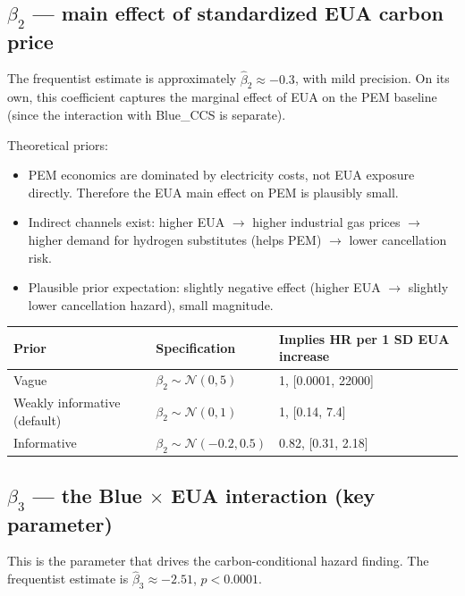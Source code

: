 \documentclass[11pt,a4paper]{article}
\newcommand{\N}{\mathcal{N}}
\begin{document}
\subsection{$\beta_2$ --- main effect of standardized EUA carbon price}

The frequentist estimate is approximately $\hat\beta_2 \approx -0.3$, with mild precision. On its own, this coefficient captures the marginal effect of EUA on the PEM baseline (since the interaction with Blue\_CCS is separate).

\begin{rationale}
Theoretical priors:
\begin{itemize}
  \item PEM economics are dominated by electricity costs, not EUA exposure directly. Therefore the EUA main effect on PEM is plausibly small.
  \item Indirect channels exist: higher EUA $\to$ higher industrial gas prices $\to$ higher demand for hydrogen substitutes (helps PEM) $\to$ lower cancellation risk.
  \item Plausible prior expectation: slightly negative effect (higher EUA $\to$ slightly lower cancellation hazard), small magnitude.
\end{itemize}
\end{rationale}

\begin{table}[h]
\centering
\begin{tabular}{lll}
\toprule
\textbf{Prior} & \textbf{Specification} & \textbf{Implies HR per 1 SD EUA increase} \\
\midrule
Vague & $\beta_2 \sim \N(0, 5)$ & 1, [0.0001, 22000] \\
Weakly informative (default) & $\beta_2 \sim \N(0, 1)$ & 1, [0.14, 7.4] \\
Informative & $\beta_2 \sim \N(-0.2, 0.5)$ & 0.82, [0.31, 2.18] \\
\bottomrule
\end{tabular}
\end{table}

\subsection{$\beta_3$ --- the Blue $\times$ EUA interaction (key parameter)}

This is the parameter that drives the carbon-conditional hazard finding. The frequentist estimate is $\hat\beta_3 \approx -2.51$, $p < 0.0001$.
\end{document}
